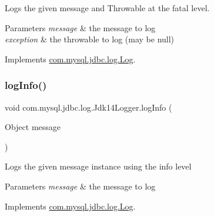 Logs the given message and Throwable at the \textquotesingle{}fatal\textquotesingle{} level.


\begin{DoxyParams}{Parameters}
{\em message} & the message to log \\
\hline
{\em exception} & the throwable to log (may be null) \\
\hline
\end{DoxyParams}


Implements \mbox{\hyperlink{interfacecom_1_1mysql_1_1jdbc_1_1log_1_1_log_a6da5bf2be5d9c63cfd192ab457aaff92}{com.\+mysql.\+jdbc.\+log.\+Log}}.

\mbox{\label{classcom_1_1mysql_1_1jdbc_1_1log_1_1_jdk14_logger_ad10df21ceab0fe74659381483cc45ebb}} 
\subsubsection{\texorpdfstring{log\+Info()}{logInfo()}\hspace{0.1cm}{\footnotesize\ttfamily [1/2]}}
{\footnotesize\ttfamily void com.\+mysql.\+jdbc.\+log.\+Jdk14\+Logger.\+log\+Info (\begin{DoxyParamCaption}\item[{Object}]{message }\end{DoxyParamCaption})}

Logs the given message instance using the \textquotesingle{}info\textquotesingle{} level


\begin{DoxyParams}{Parameters}
{\em message} & the message to log \\
\hline
\end{DoxyParams}


Implements \mbox{\hyperlink{interfacecom_1_1mysql_1_1jdbc_1_1log_1_1_log_a6a380b7638c3ebe1251d4e07cb7f4569}{com.\+mysql.\+jdbc.\+log.\+Log}}.

\mbox{\label{classcom_1_1mysql_1_1jdbc_1_1log_1_1_jdk14_logger_ac14f891efdd7a92c4b6165555221f008}} 
